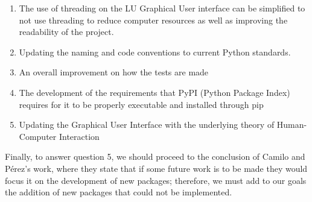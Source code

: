 \begin{enumerate}
    \item The use of threading on the LU Graphical User interface can be simplified to not use threading to reduce computer resources as well as improving the readability of the project.
    \item Updating the naming and code conventions to current Python standards.
    \item An overall improvement on how the tests are made
    \item The development of the requirements that PyPI (Python Package Index) requires for it to be properly executable and installed through pip
    \item Updating the Graphical User Interface with the underlying theory of Human-Computer Interaction
\end{enumerate}

Finally, to answer question 5, we should proceed to the conclusion of Camilo and Pérez's work, where they state that if some future work is to be made they would focus it on the development of new packages; therefore, we must add to our goals the addition of new packages that could not be implemented.


